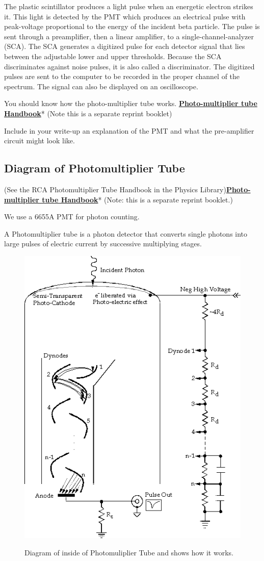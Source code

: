 \documentclass{../lab}
\begin{document}
The plastic scintillator produces a light pulse when an energetic electron strikes it. This light is detected by the PMT which produces an electrical pulse with peak-voltage proportional to the energy of the incident beta particle. The pulse is sent through a preamplifier, then a linear amplifier, to a single-channel-analyzer (SCA). The SCA generates a digitized pulse for each detector signal that lies between the adjustable lower and upper thresholds. Because the SCA discriminates against noise pulses, it is also called a discriminator. The digitized pulses are sent to the computer to be recorded in the proper channel of the spectrum. The signal can also be displayed on an oscilloscope.

You should know how the photo-multiplier tube works. \href{http://physics111.lib.berkeley.edu/Physics111/Equipment\_Manuals/RCA\_PMT.pdf}{\textbf{Photo-multiplier tube Handbook}}* (Note this is a separate reprint booklet)

Include in your write-up an explanation of the PMT and what the pre-amplifier circuit might look like.

\subsection{Diagram of Photomultiplier Tube}

(See the RCA Photomultiplier Tube Handbook in the Physics Library)\href{http://physics111.lib.berkeley.edu/Physics111/Equipment\_Manuals/RCA\_PMT.pdf}{\textbf{Photo-multiplier tube Handbook}}* (Note: this is a separate reprint booklet.)

We use a 6655A PMT for photon counting.

A Photomultiplier tube is a photon detector that converts single photons into large pulses of electric current by successive multiplying stages.

\begin{figure}[h]
    \centering
    \href{http://experimentationlab.berkeley.edu/sites/default/files/images/BRAimage047.gif}{\includegraphics[width=0.5\linewidth]{images/BRAimage047.png}}
    \caption{Diagram of inside of Photomuliplier Tube and shows how it works.}
    \label{fig:BRAimage047}
\end{figure}
\end{document}
